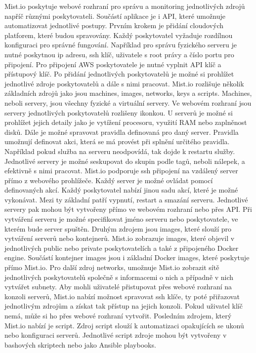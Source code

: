     Mist.io poskytuje webové rozhraní pro správu a monitoring jednotlivých zdrojů \linebreak napříč různými poskytovateli. Součástí aplikace je i API, které umožnuje automatizovat jednotlivé postupy. Prvním krokem je přidání cloudových platforem, které budou \linebreak spravovány. Každý poskytovatel vyžaduje rozdílnou konfiguraci pro správné \linebreak fungování. Například pro správu fyzického serveru je nutné poskytnou ip adresu, ssh klíč, uživatele s root právy a číslo portu pro připojení. Pro připojení AWS poskytovatele je nutné vyplnit API klíč a přístupový klíč. Po přidání jednotlivých poskytovatelů je možné si prohlížet jednotlivé zdroje poskytovatelů a dále s nimi pracovat. Mist.io rozlišuje několik základních zdrojů jako jsou machines, images, networks, keys a scripts. Machines, neboli servery, jsou všechny fyzické a virtuální servery. Ve webovém rozhraní jsou servery jednotlivých poskytovatelů rozlišeny ikonkou. U serverů je možné si prohlížet jejich detaily jako je vytížení procesoru, využití RAM nebo \linebreak zaplněnost disků. Dále je možné spravovat pravidla definovaná pro daný server. \linebreak Pravidla umožnují definovat akci, která se má provést při splnění určitého pravidla. Například pokud služba na serveru neodpovídá, tak dojde k restartu služby. Jednotlivé servery je možné seskupovat do skupin podle tagů, neboli nálepek, a efektivně s nimi pracovat. Mist.io podporuje ssh připojení na vzdálený server přímo z webového prohlížeče. Každý server je možné ovládat pomocí definovaných akcí. Každý poskytovatel nabízí jinou sadu akcí, které je možné vykonávat. Mezi ty základní patří vypnutí, restart a smazání serveru. Jednotlivé servery pak mohou být vytvořeny přímo \linebreak ve webovém rozhraní nebo přes API. Při vytváření serveru je možné specifikovat jméno serveru nebo poskytovatele, ve kterém bude server spuštěn. Druhým zdrojem jsou images, které slouží pro vytváření serverů nebo kontejnerů. Mist.io zobrazuje \linebreak images, které objevil v jednotlivých public nebo private poskytovatelích a také z připojeného Docker engine. Součástí kontejner images jsou i základní Docker images, které poskytuje přímo Mist.io. Pro další zdroj networks, umožnuje Mist.io zobrazit sítě jednotlivých poskytovatelů společně s informacemi o nich a případně v nich vytvářet subnety.  Aby mohli uživatelé přistupovat přes webové rozhraní na konzoli serverů, Mist.io nabízí možnost spravovat ssh klíče, ty poté přiřazovat jednotlivým zdrojům a získat tak přístup na jejich konzoli. Pokud uživatel klíč nemá, může si ho přes webové rozhraní vytvořit. Posledním zdrojem, který Mist.io nabízí je script. Zdroj script slouží \linebreak k automatizaci opakujících se ukonů nebo konfiguraci serverů. Jednotlivé script zdroje mohou být vytvořeny v bashových skriptech nebo jako Ansible playbooks. 

